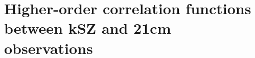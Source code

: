 \chapter{Higher-order correlation functions between kSZ and 21cm observations}
\label{chapter:ksz_21cm}